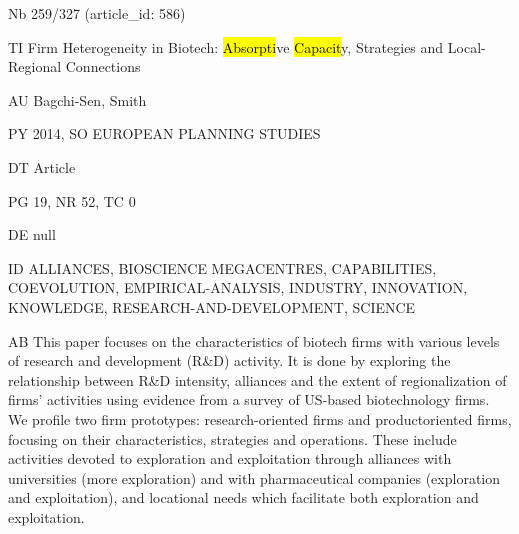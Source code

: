 \documentclass[a4paper]{article}
\begin{document}
\vspace*{-2cm}
Nb \tabto{0cm}259/327 (article\_id: 586)\par
TI \tabto{0cm}Firm Heterogeneity in Biotech: \hl{Absorpti}ve \hl{Capacit}y, Strategies and Local-Regional Connections\par
AU \tabto{0cm}Bagchi-Sen, Smith\par
PY \tabto{0cm}2014, SO EUROPEAN PLANNING STUDIES\par
DT \tabto{0cm}Article\par
PG \tabto{0cm}19, NR 52, TC 0\par
DE \tabto{0cm}null\par
ID \tabto{0cm}ALLIANCES, BIOSCIENCE MEGACENTRES, CAPABILITIES, COEVOLUTION, EMPIRICAL-ANALYSIS, INDUSTRY, INNOVATION, KNOWLEDGE, RESEARCH-AND-DEVELOPMENT, SCIENCE\par
AB \tabto{0cm}This paper focuses on the characteristics of biotech firms with various levels of research and development (R\&D) activity. It is done by exploring the relationship between R\&D intensity, alliances and the extent of regionalization of firms' activities using evidence from a survey of US-based biotechnology firms. We profile two firm prototypes: research-oriented firms and productoriented firms, focusing on their characteristics, strategies and operations. These include activities devoted to exploration and exploitation through alliances with universities (more exploration) and with pharmaceutical companies (exploration and exploitation), and locational needs which facilitate both exploration and exploitation.\par
\clearpage
\end{document}
